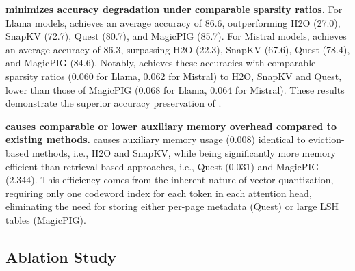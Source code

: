 \noindent \textbf{{\name} minimizes accuracy degradation under comparable sparsity ratios.}
For Llama models,
{\name} achieves an average accuracy of 86.6, outperforming H2O (27.0), SnapKV (72.7), Quest (80.7), and MagicPIG (85.7).
For Mistral models,
{\name} achieves an average accuracy of 86.3, surpassing H2O (22.3), SnapKV (67.6), Quest (78.4), and MagicPIG (84.6).
Notably, {\name} achieves these accuracies with comparable sparsity ratios (0.060 for Llama, 0.062 for Mistral) to H2O, SnapKV and Quest, lower than those of MagicPIG (0.068 for Llama, 0.064 for Mistral). 
These results demonstrate the superior accuracy preservation of {\name}.

\noindent \textbf{{\name} causes comparable or lower auxiliary memory overhead compared to existing methods.}
{\name} causes auxiliary memory usage (0.008) identical to eviction-based methods, i.e., H2O and SnapKV, while being significantly more memory efficient than retrieval-based approaches, i.e., Quest (0.031) and MagicPIG (2.344).
This efficiency comes from the inherent nature of vector quantization, requiring only one codeword index for each token in each attention head, eliminating the need for storing either per-page metadata (Quest) or large LSH tables (MagicPIG).

\subsection{Ablation Study}

